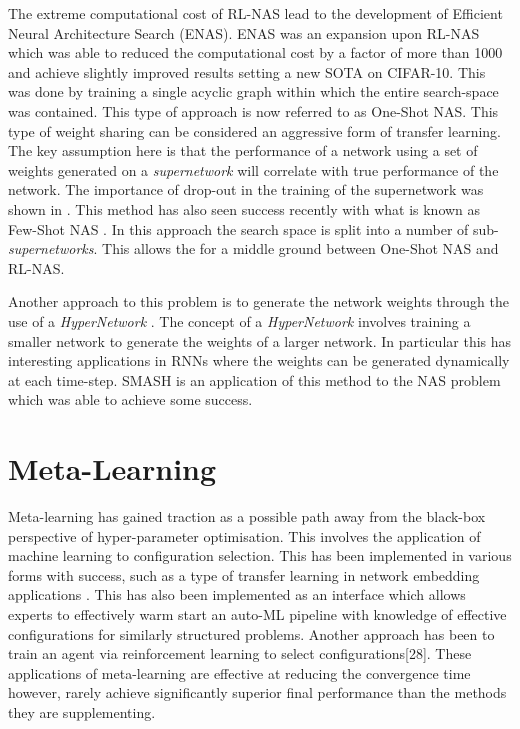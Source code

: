 \documentclass{article}
\begin{document}
  
	The extreme computational cost of RL-NAS lead to the development of Efficient Neural Architecture Search (ENAS). ENAS \cite{ENAS} was an expansion upon RL-NAS which was able to reduced the computational cost by a factor of more than 1000 and achieve slightly improved results setting a new SOTA on CIFAR-10. This was done by training a single acyclic graph within which the entire search-space was contained. This type of approach is now referred to as One-Shot NAS. This type of weight sharing can be considered an aggressive form of transfer learning. The key assumption here is that the performance of a network using a set of weights generated on a \textit{supernetwork} will correlate with true performance of the network. The importance of drop-out in the training of the supernetwork was shown in \cite{ENAS-T}. This method has also seen success recently with what is known as Few-Shot NAS \cite{fewshot}. In this approach the search space is split into a number of sub-\textit{supernetworks}. This allows the for a middle ground between One-Shot NAS and RL-NAS. 
	\par
	Another approach to this problem is to generate the network weights through the use of a \textit{HyperNetwork} \cite{hypernetworks}. The concept of a \textit{HyperNetwork} involves training a smaller network to generate the weights of a larger network. In particular this has interesting applications in RNNs where the weights can be generated dynamically at each time-step. SMASH \cite{smash} is an application of this method to the NAS problem which was able to achieve some success.  






    



\section{Meta-Learning}

	Meta-learning has gained traction as a possible path away from the black-box perspective of hyper-parameter optimisation. This involves the application of machine learning to configuration selection. This has been implemented in various forms with success, such as a type of transfer learning in network embedding applications \cite{9}. This has also been implemented as an interface which allows experts to effectively warm start an auto-ML pipeline with knowledge of effective configurations for similarly structured problems\cite{29}. Another approach has been to train an agent via reinforcement learning to select configurations[28]. These applications of meta-learning are effective at reducing the convergence time however, rarely achieve significantly superior final performance than the methods they are supplementing.\cite{31}\cite{29}

\printbibliography
\end{document}
